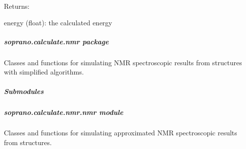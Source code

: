 \documentclass[letterpaper,10pt,english]{sphinxmanual}
\begin{document}
\begin{fulllineitems}
\begin{DUlineblock}{0em}
\item[] Returns:
\item[]
\begin{DUlineblock}{\DUlineblockindent}
\item[] energy (float): the calculated energy
\end{DUlineblock}
\end{DUlineblock}

\end{fulllineitems}



\subparagraph{soprano.calculate.nmr package}
\label{doctree/soprano.calculate.nmr:module-soprano.calculate.nmr}\label{doctree/soprano.calculate.nmr::doc}\label{doctree/soprano.calculate.nmr:soprano-calculate-nmr-package}
Classes and functions for simulating NMR spectroscopic results from
structures with simplified algorithms.


\subparagraph{Submodules}
\label{doctree/soprano.calculate.nmr:submodules}

\subparagraph{soprano.calculate.nmr.nmr module}
\label{doctree/soprano.calculate.nmr.nmr:module-soprano.calculate.nmr.nmr}\label{doctree/soprano.calculate.nmr.nmr:soprano-calculate-nmr-nmr-module}\label{doctree/soprano.calculate.nmr.nmr::doc}
Classes and functions for simulating approximated NMR spectroscopic results
from structures.
\end{document}
